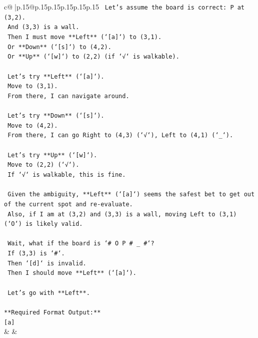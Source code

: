 \documentclass{article}
\begin{document}
{\begin{supertabular}{c@{$\;$}|p{.15\linewidth}@{}p{.15\linewidth}p{.15\linewidth}p{.15\linewidth}p{.15\linewidth}p{.15\linewidth}}
{{{\texttt{    Let's assume the board is correct: P at (3,2).} \\
\texttt{    And (3,3) is a wall.} \\
\texttt{    Then I must move **Left** (`{[}a{]}`) to (3,1).} \\
\texttt{    Or **Down** (`{[}s{]}`) to (4,2).} \\
\texttt{    Or **Up** (`{[}w{]}`) to (2,2) (if `√` is walkable).} \\
\\ 
\texttt{    Let's try **Left** (`{[}a{]}`).} \\
\texttt{    Move to (3,1).} \\
\texttt{    From there, I can navigate around.} \\
\\ 
\texttt{    Let's try **Down** (`{[}s{]}`).} \\
\texttt{    Move to (4,2).} \\
\texttt{    From there, I can go Right to (4,3) (`√`), Left to (4,1) (`\_`).} \\
\\ 
\texttt{    Let's try **Up** (`{[}w{]}`).} \\
\texttt{    Move to (2,2) (`√`).} \\
\texttt{    If `√` is walkable, this is fine.} \\
\\ 
\texttt{    Given the ambiguity, **Left** (`{[}a{]}`) seems the safest bet to get out of the current spot and re{-}evaluate.} \\
\texttt{    Also, if I am at (3,2) and (3,3) is a wall, moving Left to (3,1) (`O`) is likely valid.} \\
\\ 
\texttt{    Wait, what if the board is `\# O P \# \_ \#`?} \\
\texttt{    If (3,3) is `\#`.} \\
\texttt{    Then `{[}d{]}` is invalid.} \\
\texttt{    Then I should move **Left** (`{[}a{]}`).} \\
\\ 
\texttt{    Let's go with **Left**.} \\
\\ 
\texttt{**Required Format Output:**} \\
\texttt{{[}a{]}} \\
            }
        }
    }
    & & \\ \\


\end{supertabular}}
\end{document}
